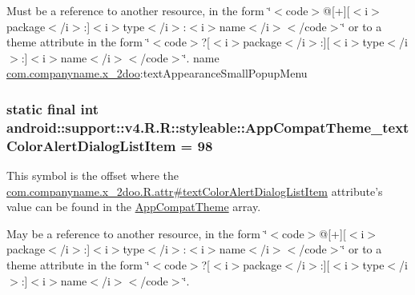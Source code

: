 Must be a reference to another resource, in the form \char`\"{}$<$code$>$@\mbox{[}+\mbox{]}\mbox{[}$<$i$>$package$<$/i$>$:\mbox{]}$<$i$>$type$<$/i$>$:$<$i$>$name$<$/i$>$$<$/code$>$\char`\"{} or to a theme attribute in the form \char`\"{}$<$code$>$?\mbox{[}$<$i$>$package$<$/i$>$:\mbox{]}\mbox{[}$<$i$>$type$<$/i$>$:\mbox{]}$<$i$>$name$<$/i$>$$<$/code$>$\char`\"{}.  name \hyperlink{namespacecom_1_1companyname_1_1x__2doo}{com.companyname.x\_\-2doo}:textAppearanceSmallPopupMenu \hypertarget{classandroid_1_1support_1_1v4_1_1_r_1_1styleable_6a0419e5a5e9ea88ff3f7d058fe92b7a}{
\subsubsection[{AppCompatTheme\_\-textColorAlertDialogListItem}]{\setlength{\rightskip}{0pt plus 5cm}static final int android::support::v4.R.R::styleable::AppCompatTheme\_\-textColorAlertDialogListItem = 98}}
\label{classandroid_1_1support_1_1v4_1_1_r_1_1styleable_6a0419e5a5e9ea88ff3f7d058fe92b7a}


This symbol is the offset where the \hyperlink{classcom_1_1companyname_1_1x__2doo_1_1_r_1_1attr_8a424228ee251472c1d91f95b08e3912}{com.companyname.x\_\-2doo.R.attr\#textColorAlertDialogListItem} attribute's value can be found in the \hyperlink{classandroid_1_1support_1_1v4_1_1_r_1_1styleable_0873e92ba21076bb5a4aeadeb7f5779f}{AppCompatTheme} array.

May be a reference to another resource, in the form \char`\"{}$<$code$>$@\mbox{[}+\mbox{]}\mbox{[}$<$i$>$package$<$/i$>$:\mbox{]}$<$i$>$type$<$/i$>$:$<$i$>$name$<$/i$>$$<$/code$>$\char`\"{} or to a theme attribute in the form \char`\"{}$<$code$>$?\mbox{[}$<$i$>$package$<$/i$>$:\mbox{]}\mbox{[}$<$i$>$type$<$/i$>$:\mbox{]}$<$i$>$name$<$/i$>$$<$/code$>$\char`\"{}. 

